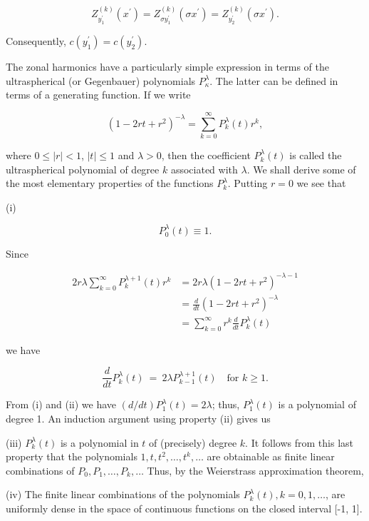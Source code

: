 \[
Z_{y_{1}^{\prime}}^{(k)}(x^{\prime})=Z_{\sigma y_{1}^{\prime}}^{(k)}(\sigma x^{\prime})=Z_{y_{2}^{\prime}}^{(k)}(\sigma x^{\prime}).
\]

Consequently, $c(y_{1}^{\prime}) = c(y_{2}^{\prime})$.

The zonal harmonics have a particularly simple expression in terms of the ultraspherical (or Gegenbauer) polynomials $P_{\kappa}^{\lambda}$. The latter can be defined in terms of a generating function. If we write

\[
(1-2rt+r^{2})^{-\lambda}=\sum_{k=0}^{\infty}P_{k}^{\lambda}(t)r^{k},
\]

where $0 \leq |r| < 1$, $|t| \leq 1$ and $\lambda > 0$, then the coefficient $P_k^\lambda(t)$ is called the ultraspherical polynomial of degree $k$ associated with $\lambda$. We shall derive some of the most elementary properties of the functions $P_k^\lambda$. Putting $r = 0$ we see that

(i)

\[
P_{0}^{\lambda}(t)\equiv1.
\]

Since

\[
\begin{aligned}2r\lambda\sum_{k=0}^{\infty}P_{k}^{\lambda+1}(t)r^{k}&=2r\lambda(1-2rt+r^{2})^{-\lambda-1}\\&=\frac{d}{dt}(1-2rt+r^{2})^{-\lambda}\\&=\sum_{k=0}^{\infty}r^{k}\frac{d}{dt}P_{k}^{\lambda}(t)\end{aligned}
\]

we have

\begin{equation}
\tag{ii}
\frac{d}{d t}P_{k}^{\lambda}(t)\:=\:2\lambda P_{k-1}^{\lambda+1}(t)\quad\text{for }k\geq1.
\end{equation}

From (i) and (ii) we have $(d/dt)P_1^\lambda(t) = 2\lambda$; thus, $P_1^\lambda(t)$ is a polynomial of degree 1. An induction argument using property (ii) gives us

(iii) $P_{k}^\lambda(t)$ is a polynomial in $t$ of (precisely) degree $k$. It follows from this last property that the polynomials $1, t, t^2, \ldots, t^k, \ldots$ are obtainable as finite linear combinations of $P_0, P_1, \ldots, P_k, \ldots$ Thus, by the Weierstrass approximation theorem,

(iv) The finite linear combinations of the polynomials $P_k^\lambda(t), k = 0, 1, \ldots$, are uniformly dense in the space of continuous functions on the closed interval [-1, 1].

